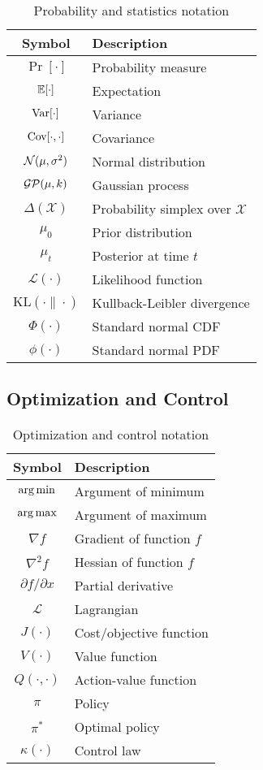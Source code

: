 \begin{table}[h]
\centering
\begin{tabular}{cl}
\toprule
\textbf{Symbol} & \textbf{Description} \\
\midrule
$\Pr[\cdot]$ & Probability measure \\
$\operatorname{\mathbb{E}}[\cdot]$ & Expectation \\
$\operatorname{\text{Var}}[\cdot]$ & Variance \\
$\operatorname{\text{Cov}}[\cdot, \cdot]$ & Covariance \\
$\mathcal{N}(\mu, \sigma^2)$ & Normal distribution \\
$\mathcal{GP}(\mu, k)$ & Gaussian process \\
$\Delta(\mathcal{X})$ & Probability simplex over $\mathcal{X}$ \\
$\mu_0$ & Prior distribution \\
$\mu_t$ & Posterior at time $t$ \\
$\mathcal{L}(\cdot)$ & Likelihood function \\
$\text{KL}(\cdot \| \cdot)$ & Kullback-Leibler divergence \\
$\Phi(\cdot)$ & Standard normal CDF \\
$\phi(\cdot)$ & Standard normal PDF \\
\bottomrule
\end{tabular}
\caption{Probability and statistics notation}
\end{table}

\subsection{Optimization and Control}

\begin{table}[h]
\centering
\begin{tabular}{cl}
\toprule
\textbf{Symbol} & \textbf{Description} \\
\midrule
$\operatorname{arg\,min}$ & Argument of minimum \\
$\operatorname{arg\,max}$ & Argument of maximum \\
$\nabla f$ & Gradient of function $f$ \\
$\nabla^2 f$ & Hessian of function $f$ \\
$\partial f / \partial x$ & Partial derivative \\
$\mathcal{L}$ & Lagrangian \\
$J(\cdot)$ & Cost/objective function \\
$V(\cdot)$ & Value function \\
$Q(\cdot, \cdot)$ & Action-value function \\
$\pi$ & Policy \\
$\pi^*$ & Optimal policy \\
$\kappa(\cdot)$ & Control law \\
\bottomrule
\end{tabular}
\caption{Optimization and control notation}
\end{table}


